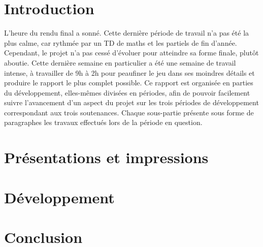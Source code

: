 \documentclass[12pt, french]{article}
\begin{document}


\tableofcontents
\vspace{2cm}

\pagestyle{fancy}

\section{Introduction}

L'heure du rendu final a sonné. Cette dernière période de travail n'a pas été la plus calme, car rythmée par un TD de maths et les partiels de fin d'année.
Cependant, le projet n'a pas cessé d'évoluer pour atteindre sa forme finale, plutôt aboutie. Cette dernière semaine en particulier a été une semaine 
de travail intense, à travailler de 9h à 2h pour peaufiner le jeu dans ses moindres détails et produire le rapport le plus complet possible.
Ce rapport est organisée en parties du développement, elles-mêmes divisées en périodes, afin de pouvoir facilement suivre l'avancement d'un 
aspect du projet sur les trois périodes de développement correspondant aux trois soutenances. Chaque sous-partie présente sous forme de paragraphes 
les travaux effectués lors de la période en question.

\section{Présentations et impressions}



\section{Développement}












\newpage

\section{Conclusion}
\end{document}
